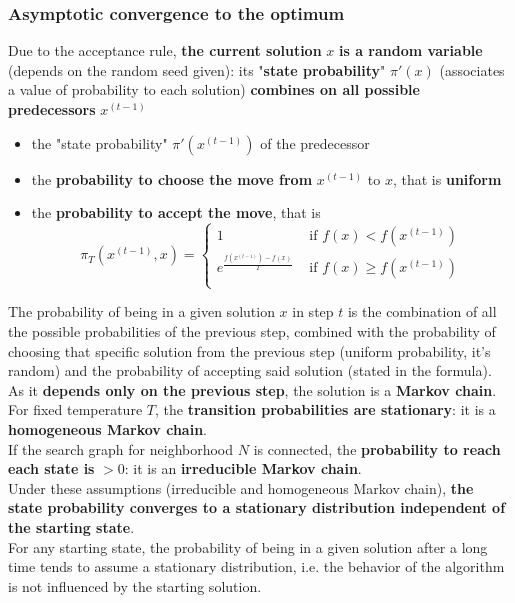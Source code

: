\newpage

\subsubsection{Asymptotic convergence to the optimum}

Due to the acceptance rule, \textbf{the current solution} $x$ \textbf{is a random variable} (depends on the random seed given): its "\textbf{state probability}" $\pi' (x)$ (associates a value of probability to each solution) \textbf{combines on all possible predecessors} $x^{(t−1)}$ 
\begin{itemize}
	\item the "state probability" $\pi' (x^{(t−1)})$ of the predecessor
	
	\item the \textbf{probability to choose the move from} $x^{(t−1)}$ to $x$, that is \textbf{uniform}
	
	\item the \textbf{probability to accept the move}, that is
	$$ \pi_T \left(x^{(t-1)}, x\right) = \begin{cases}
		1 & \text{ if } f(x) < f \left(x^{(t-1)}\right) \\
		e^{\frac{f\left(x^{(t-1)}\right) - f(x)}{T}} & \text{ if } f(x) \geq f \left(x^{(t-1)}\right) \\
	\end{cases}$$
\end{itemize}

The probability of being in a given solution $x$ in step $t$ is the combination of all the possible probabilities of the previous step, combined with the probability of choosing that specific solution from the previous step (uniform probability, it's random) and the probability of accepting said solution (stated in the formula).\\

As it \textbf{depends only on the previous step}, the solution is a \textbf{Markov chain}.\\

For fixed temperature $T$, the \textbf{transition probabilities are stationary}: it is a \textbf{homogeneous Markov chain}.\\

If the search graph for neighborhood $N$ is connected, the \textbf{probability to reach each state is} $> 0$: it is an \textbf{irreducible Markov chain}.\\

Under these assumptions (irreducible and homogeneous Markov chain), \textbf{the state probability converges to a stationary distribution independent of the starting state}. \\
For any starting state, the probability of being in a given solution after a long time tends to assume a stationary distribution, i.e. the behavior of the algorithm is not influenced by the starting solution.\\

